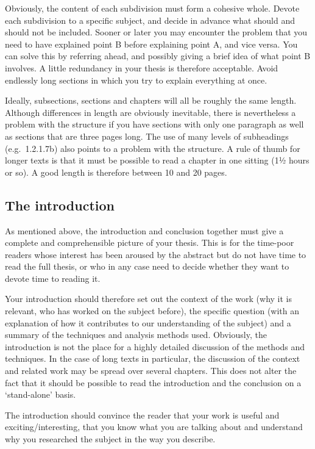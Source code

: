 Obviously, the content of each subdivision must form a cohesive whole.
Devote each subdivision to a specific subject, and decide in advance what should and should not be included.
Sooner or later you may encounter the problem that you need to have explained point B before explaining point A, and vice versa.
You can solve this by referring ahead, and possibly giving a brief idea of what point B involves.
A little redundancy in your thesis is therefore acceptable.
Avoid endlessly long sections in which you try to explain everything at once.

Ideally, subsections, sections and chapters will all be roughly the same length.
Although differences in length are obviously inevitable, there is nevertheless a problem with the structure if you have sections with only one paragraph as well as sections that are three pages long.
The use of many levels of  subheadings (e.g.\ 1.2.1.7b) also points to a problem with the structure.
A rule of thumb for longer texts is that it must be possible to read a chapter in one sitting (1½ hours or so).
A good length is therefore between 10 and 20 pages.

\subsection{The introduction}\label{sec:_the_introduction}
As mentioned above, the introduction and conclusion together must give a complete and comprehensible picture of your thesis.
This is for the time-poor readers whose interest has been aroused by the abstract but do not have time to read the full thesis, or who in any case need to decide whether they want to devote time to reading it.

Your introduction should therefore set out the context of the work (why it is relevant, who has worked on the subject before), the specific question (with an explanation of how it contributes to our understanding of the subject) and a summary of the techniques and analysis methods used.
Obviously, the introduction is not the place for a highly detailed discussion of the methods and techniques.
In the case of long texts in particular, the discussion of the context and related work may be spread over several chapters.
This does not alter the fact that it should be possible to read the introduction and the conclusion on a `stand-alone' basis.

The introduction should convince the reader that your work is useful and exciting/interesting, that you know what you are talking about and understand why you researched the subject in the way you describe.

